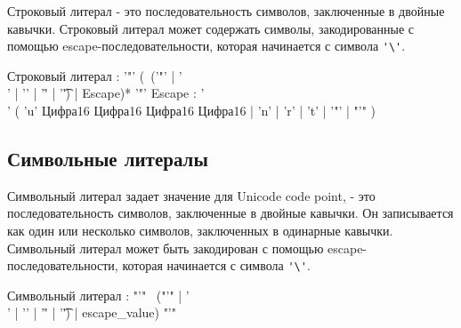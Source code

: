 Строковый литерал - это последовательность символов, заключенные в двойные кавычки. Строковый литерал может содержать символы, закодированные с помощью escape-последовательности, которая начинается с символа \verb+'\'+.

\begin{Grammar}
Строковый литерал
    : '"'
    (~('"' | '\\' | '\n' | '\r' | '\t') | Escape)* 
    '"' 
Escape
    : '\\'
    ( 'u' Цифра16 Цифра16 Цифра16 Цифра16
    | 'n' | 'r' | 't' 
    | '"'
    | "'"
    )
\end{Grammar}  

\hypertarget{symlit}{%
\subsection{Символьные литералы}\label{lex:symlit}}

Символьный литерал задает значение для Unicode code point, - это последовательность символов, заключенные в двойные кавычки.
Он записывается как один или несколько символов, заключенных в одинарные кавычки. Символьный литерал может быть закодирован с помощью escape-последовательности, которая начинается с символа \verb+'\'+.

\begin{Grammar}
Символьный литерал
    : "'" 
    ~("'" | '\\' | '\n' | '\r' | '\t') | escape_value)
    "'"
\end{Grammar}  